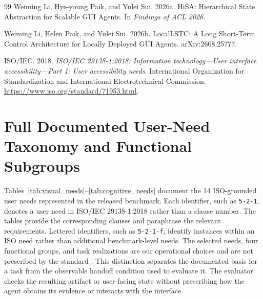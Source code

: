 \documentclass[11pt]{article}
\begin{document}
\begin{thebibliography}{99}
Weiming Li, Hye-young Paik, and Yulei Sui. 2026a.
\newblock HiSA: Hierarchical State Abstraction for Scalable GUI Agents.
\newblock In \emph{Findings of ACL 2026}.

Weiming Li, Helen Paik, and Yulei Sui. 2026b.
\newblock LocalLSTC: A Long Short-Term Control Architecture for Locally Deployed GUI Agents.
\newblock arXiv:2608.25777.

ISO/IEC. 2018.
\newblock \emph{ISO/IEC 29138-1:2018: Information technology---User interface accessibility---Part 1: User accessibility needs}.
\newblock International Organization for Standardization and International Electrotechnical Commission.
\newblock \url{https://www.iso.org/standard/71953.html}.

\end{thebibliography}

\appendix

\section{Full Documented User-Need Taxonomy and Functional Subgroups}
\label{app:taxonomy}

Tables~\ref{tab:visual_needs}--\ref{tab:cognitive_needs} document the 14 ISO-grounded user needs represented in the released benchmark. Each identifier, such as \texttt{5-2-1}, denotes a user need in ISO/IEC 29138-1:2018 rather than a clause number. The tables provide the corresponding clauses and paraphrase the relevant requirements. Lettered identifiers, such as \texttt{5-2-1-f}, identify instances within an ISO need rather than additional benchmark-level needs. The selected needs, four functional groups, and task realizations are our operational choices and are not prescribed by the standard \citep{iso29138}. This distinction separates the documented basis for a task from the observable handoff condition used to evaluate it. The evaluator checks the resulting artifact or user-facing state without prescribing how the agent obtains its evidence or interacts with the interface.
\end{document}
